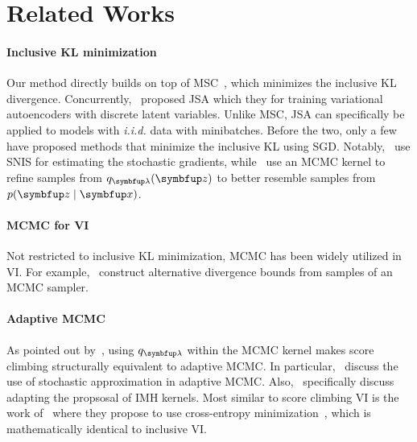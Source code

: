 \vspace{-0.05in}
\section{Related Works}\label{section:related}
\vspace{-0.0in}
\paragraph{Inclusive KL minimization}
Our method directly builds on top of MSC~\citep{NEURIPS2020_b2070693}, which minimizes the inclusive KL divergence.
Concurrently,~\citet{pmlr-v124-ou20a} proposed JSA which they for training variational autoencoders with discrete latent variables.
Unlike MSC, JSA can specifically be applied to models with \textit{i.i.d.} data with minibatches.
Before the two, only a few have proposed methods that minimize the inclusive KL using SGD.
Notably,~\citet{DBLP:journals/corr/BornscheinB14} use SNIS for estimating the stochastic gradients, while~\citet{li_approximate_2017} use an MCMC kernel to refine samples from \(q_{\vlambda}(\vz)\) to better resemble samples from \(p(\vz\mid\vx)\).

\vspace{-0.05in}
\paragraph{MCMC for VI}
Not restricted to inclusive KL minimization, MCMC has been widely utilized in VI.
For example,~\citet{pmlr-v37-salimans15, pmlr-v97-ruiz19a} construct alternative divergence bounds from samples of an MCMC sampler.

\vspace{-0.05in}
\paragraph{Adaptive MCMC}
As pointed out by~\citet{pmlr-v124-ou20a}, using \(q_{\vlambda}\) within the MCMC kernel makes score climbing structurally equivalent to adaptive MCMC.
In particular,~\citet{10.1007/s11222-008-9110-y, garthwaite_adaptive_2016} discuss the use of stochastic approximation in adaptive MCMC.
Also,~\citet{andrieu_ergodicity_2006, keith_adaptive_2008, holden_adaptive_2009, giordani_adaptive_2010} specifically discuss adapting the propsosal of IMH kernels.
Most similar to score climbing VI is the work of~\citet{keith_adaptive_2008} where they propose to use cross-entropy minimization~\citep{barbakh_cross_2009}, which is mathematically identical to inclusive VI.

